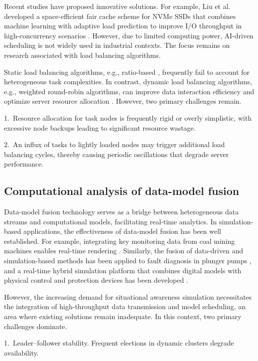 \documentclass[twoside,twocolumn]{article}
\begin{document}
Recent studies have proposed innovative solutions. For example, Liu et al. developed a space-efficient fair cache scheme for NVMe SSDs that combines machine learning with adaptive load prediction to improve I/O throughput in high-concurrency scenarios \citep{Liu2023}. However, due to limited computing power, AI-driven scheduling is not widely used in industrial contexts. The focus remains on research associated with load balancing algorithms.

Static load balancing algorithms, e.g., ratio-based \citep{Luo2022}, frequently fail to account for heterogeneous task complexities. In contrast, dynamic load balancing algorithms, e.g., weighted round-robin algorithms, can improve data interaction efficiency and optimize server resource allocation \citep{Shona2023,Shrimal2024}. However, two primary challenges remain.

1.~Resource allocation for task nodes is frequently rigid or overly simplistic, with excessive node backups leading to significant resource wastage.

2.~An influx of tasks to lightly loaded nodes may trigger additional load balancing cycles, thereby causing periodic oscillations that degrade server performance.

\subsection{Computational analysis of data-model fusion}

Data-model fusion technology serves as a bridge between heterogeneous data streams and computational models, facilitating real-time analytics. In simulation-based applications, the effectiveness of data-model fusion has been well established. For example, integrating key monitoring data from coal mining machines enables real-time rendering \citep{MaHC2023}. Similarly, the fusion of data-driven and simulation-based methods has been applied to fault diagnosis in plunger pumps \citep{Zhang2023}, and a real-time hybrid simulation platform that combines digital models with physical control and protection devices has been developed \citep{Lei2024}.

However, the increasing demand for situational awareness simulation necessitates the integration of high-throughput data transmission and model scheduling, an area where existing solutions remain inadequate. In this context, two primary challenges dominate.

1.~Leader--follower stability. Frequent elections in dynamic clusters degrade availability.
\end{document}
